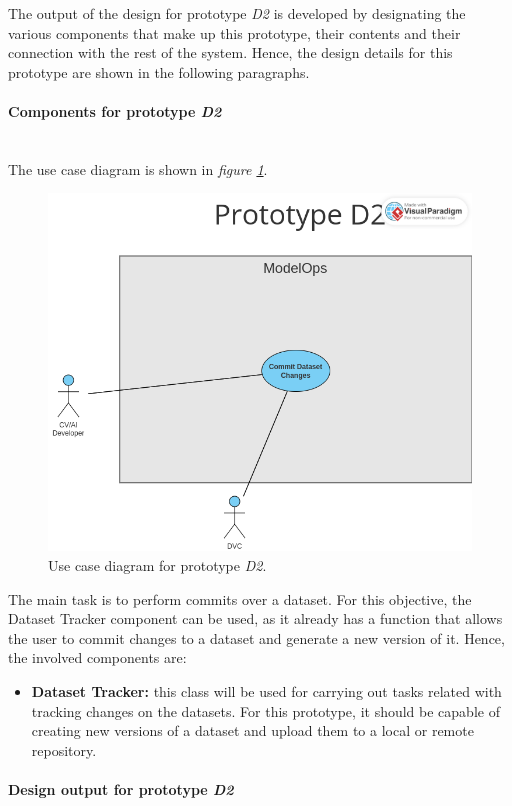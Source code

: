 The output of the design for prototype \emph{D2} is developed by designating the various components that make up this prototype, their contents and their connection with the rest of the system.
Hence, the design details for this prototype are shown in the following paragraphs.

\paragraph{Components for prototype \emph{D2}} \mbox{}\\

The use case diagram is shown in \emph{figure \ref{fig:useCaseD2}}.

\begin{figure}[H]
    \centering
    \includegraphics[width=0.7\linewidth]{figs/use-case-D2.png}
    \caption{Use case diagram for prototype \emph{D2}.}
    \label{fig:useCaseD2}
\end{figure}

The main task is to perform commits over a dataset. For this objective, the Dataset Tracker component can be used, as it already has a function that allows the user to 
commit changes to a dataset and generate a new version of it. Hence, the involved components are:

\begin{itemize}
    \item \textbf{Dataset Tracker: }this class will be used for carrying out tasks related with tracking changes on the datasets. For this prototype, it should be capable of creating new versions of a dataset and upload them to a local or remote repository.
\end{itemize}

\paragraph{Design output for prototype \emph{D2}}\mbox{}\\

